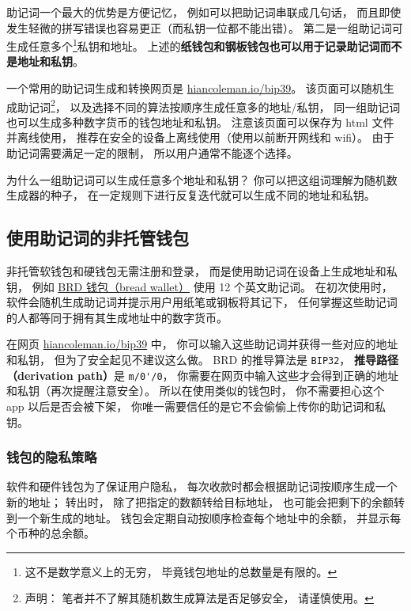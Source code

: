助记词一个最大的优势是方便记忆， 例如可以把助记词串联成几句话， 而且即使发生轻微的拼写错误也容易更正（而私钥一位都不能出错）。 第二是一组助记词可生成任意多个\footnote{这不是数学意义上的无穷， 毕竟钱包地址的总数量是有限的。}私钥和地址。 上述的\textbf{纸钱包和钢板钱包也可以用于记录助记词而不是地址和私钥}。

一个常用的助记词生成和转换网页是 \href{https://iancoleman.io/bip39/}{hiancoleman.io/bip39}。 该页面可以随机生成助记词\footnote{声明： 笔者并不了解其随机数生成算法是否足够安全， 请谨慎使用。}， 以及选择不同的算法按顺序生成任意多的地址/私钥， 同一组助记词也可以生成多种数字货币的钱包地址和私钥。 注意该页面可以保存为 html 文件并离线使用， 推荐在安全的设备上离线使用（使用以前断开网线和 wifi）。 由于助记词需要满足一定的限制， 所以用户通常不能逐个选择。

为什么一组助记词可以生成任意多个地址和私钥？ 你可以把这组词理解为随机数生成器的种子， 在一定规则下进行反复迭代就可以生成不同的地址和私钥。

\subsection{使用助记词的非托管钱包}
非托管软钱包和硬钱包无需注册和登录， 而是使用助记词在设备上生成地址和私钥， 例如 \href{https://brd.com/}{BRD 钱包（bread wallet）} 使用 12 个英文助记词。 在初次使用时， 软件会随机生成助记词并提示用户用纸笔或钢板将其记下， 任何掌握这些助记词的人都等同于拥有其生成地址中的数字货币。

在网页 \href{https://iancoleman.io/bip39/}{hiancoleman.io/bip39} 中， 你可以输入这些助记词并获得一些对应的地址和私钥， 但为了安全起见不建议这么做。 BRD 的推导算法是 \verb|BIP32|， \textbf{推导路径（derivation path）}是 \verb|m/0'/0|， 你需要在网页中输入这些才会得到正确的地址和私钥（再次提醒注意安全）。 所以在使用类似的钱包时， 你不需要担心这个 app 以后是否会被下架， 你唯一需要信任的是它不会偷偷上传你的助记词和私钥。

\subsubsection{钱包的隐私策略}
软件和硬件钱包为了保证用户隐私， 每次收款时都会根据助记词按顺序生成一个新的地址； 转出时， 除了把指定的数额转给目标地址， 也可能会把剩下的余额转到一个新生成的地址。 钱包会定期自动按顺序检查每个地址中的余额， 并显示每个币种的总余额。
